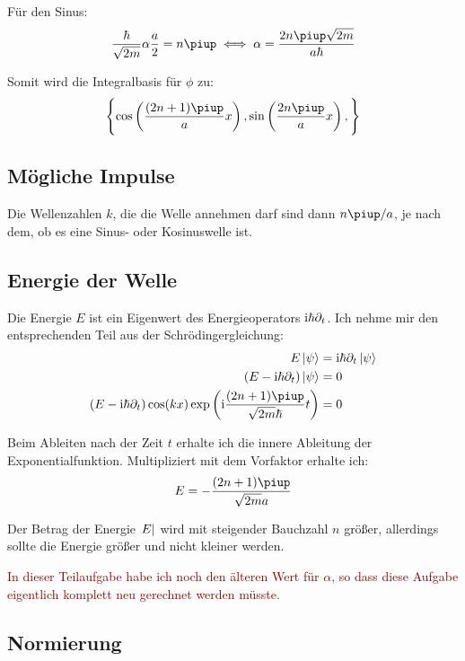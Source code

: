 Für den Sinus:
\[
	\frac\hbar{\sqrt{2m}}\alpha \frac a2 = n\piup
	\iff
	\alpha = \frac{2n\piup \sqrt{2m}}{a\hbar}
\]

Somit wird die Integralbasis für $\phi$ zu:
\[
	\set{
		\cos\del{\frac{(2n+1)\piup}{a} x},
		\sin\del{\frac{2n\piup}{a} x},
	}
\]

\subsection{Mögliche Impulse}

Die Wellenzahlen $k$, die die Welle annehmen darf sind dann $n\piup/a$, je nach dem, ob es eine Sinus- oder Kosinuswelle ist.

\subsection{Energie der Welle}

Die Energie $E$ ist ein Eigenwert des Energieoperators $\mathrm i \hbar \partial_t$. Ich nehme mir den entsprechenden Teil aus der Schrödingergleichung:
\begin{align*}
	E \ket\psi &= \iup \hbar \partial_t \ket\psi \\
	\del{E - \ii \hbar \partial_t} \ket\psi &= 0 \\
	\del{E - \ii \hbar \partial_t} \cos(kx) \exp\del{\ii \frac{(2n+1)\piup}{\sqrt{2m}\hbar} t} &= 0
\end{align*}

Beim Ableiten nach der Zeit $t$ erhalte ich die innere Ableitung der Exponentialfunktion. Multipliziert mit dem Vorfaktor erhalte ich:
\[
	E = - \frac{(2n+1)\piup}{\sqrt{2m}a}
\]

Der Betrag der Energie $\abs E$ wird mit steigender Bauchzahl $n$ größer, allerdings sollte die Energie größer und nicht kleiner werden.

\textcolor{darkred}{%
	In dieser Teilaufgabe habe ich noch den älteren Wert für $\alpha$, so dass
	diese Aufgabe eigentlich komplett neu gerechnet werden müsste.
}

\subsection{Normierung}

\fehlt


\IfFileExists{\bibliographyfile}{
	
}{}



